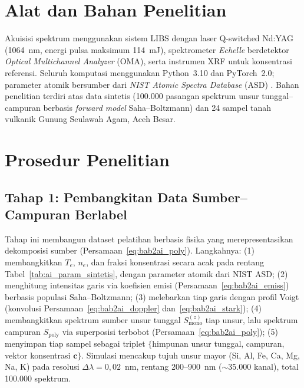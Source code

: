 \section{Alat dan Bahan Penelitian}
Akuisisi spektrum menggunakan sistem LIBS dengan laser Q-switched Nd:YAG (1064~nm, energi pulsa maksimum 114~mJ), spektrometer \textit{Echelle} berdetektor \textit{Optical Multichannel Analyzer} (OMA), serta instrumen XRF untuk konsentrasi referensi. Seluruh komputasi menggunakan Python~3.10 dan PyTorch~2.0; parameter atomik bersumber dari \textit{NIST Atomic Spectra Database} (ASD) \citep{kramida_nist_2024}. Bahan penelitian terdiri atas data sintetis (100.000 pasangan spektrum unsur tunggal--campuran berbasis \textit{forward model} Saha--Boltzmann) dan 24 sampel tanah vulkanik Gunung Seulawah Agam, Aceh Besar.

\section{Prosedur Penelitian}

\subsection{Tahap 1: Pembangkitan Data Sumber--Campuran Berlabel}
Tahap ini membangun dataset pelatihan berbasis fisika yang merepresentasikan dekomposisi sumber (Persamaan~\ref{eq:bab2ai_poly}). Langkahnya: (1) membangkitkan $T_e$, $n_e$, dan fraksi konsentrasi secara acak pada rentang Tabel~\ref{tab:ai_param_sintetis}, dengan parameter atomik dari NIST ASD; (2) menghitung intensitas garis via koefisien emisi (Persamaan~\ref{eq:bab2ai_emiss}) berbasis populasi Saha--Boltzmann; (3) melebarkan tiap garis dengan profil Voigt (konvolusi Persamaan~\ref{eq:bab2ai_doppler} dan~\ref{eq:bab2ai_stark}); (4) membangkitkan spektrum sumber unsur tunggal $S_{\mathrm{mono}}^{(z)}$ tiap unsur, lalu spektrum campuran $S_{\mathrm{poly}}$ via superposisi terbobot (Persamaan~\ref{eq:bab2ai_poly}); (5) menyimpan tiap sampel sebagai triplet $\{$himpunan unsur tunggal, campuran, vektor konsentrasi $\mathbf{c}\}$. Simulasi mencakup tujuh unsur mayor (Si, Al, Fe, Ca, Mg, Na, K) pada resolusi $\Delta\lambda = 0{,}02$~nm, rentang 200--900~nm ($\sim$35.000 kanal), total 100.000 spektrum.

